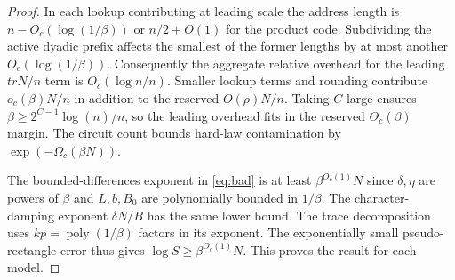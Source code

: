 \documentclass[11pt]{article}
\begin{document}
\begin{proof}
In each lookup contributing at leading scale the address length is $n-O_c(\log(1/\beta))$ or $n/2+O(1)$ for the product code. Subdividing the active dyadic prefix affects the smallest of the former lengths by at most another $O_c(\log(1/\beta))$. Consequently the aggregate relative overhead for the leading $trN/n$ term is $O_c(\log n/n)$. Smaller lookup terms and rounding contribute $o_c(\beta)N/n$ in addition to the reserved $O(\rho)N/n$. Taking $C$ large ensures $\beta\ge 2^{C-1}\log(n)/n$, so the leading overhead fits in the reserved $\Theta_c(\beta)$ margin. The circuit count bounds hard-law contamination by $\exp(-\Omega_c(\beta N))$.

The bounded-differences exponent in \eqref{eq:bad} is at least $\beta^{O_c(1)}N$ since $\delta,\eta$ are powers of $\beta$ and $L,b,B_0$ are polynomially bounded in $1/\beta$. The character-damping exponent $\delta N/B$ has the same lower bound. The trace decomposition uses $kp=\operatorname{poly}(1/\beta)$ factors in its exponent. The exponentially small pseudo-rectangle error thus gives $\log S\ge\beta^{O_c(1)}N$. This proves the result for each model.
\end{proof}
\end{document}
